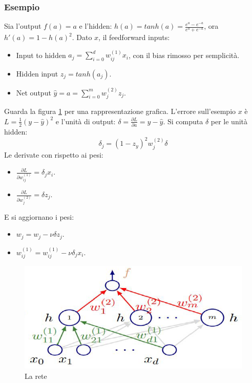 		\subsubsection{Esempio}
		Sia l'output $f(a) = a$ e l'hidden: $h(a) = tanh(a) = \frac{e^a-e^{-a}}{e^a+e^{-a}}$, ora $h'(a) = 1-h(a)^2$.
		Dato $x$, il feedforward inputs:
		\begin{multicols}{2}
			\begin{itemize}
				\item Input to hidden $a_j = \sum\limits_{i = 0}^d w_{ij}^{(1)}x_i$, con il bias rimosso per semplicit\`a.
				\item Hidden input $z_j = tanh(a_j)$.
				\item Net output $\hat{y} = a = \sum\limits_{i = 0}^m w_j^{(2)} z_j$.
			\end{itemize}
		\end{multicols}
		Guarda la figura \ref{fig:chapter11-14} per una rappresentazione grafica.
		L'errore sull'esempio $x$ \`e $L= \frac{1}{2}(y-\hat{y})^2$ e l'unit\`a di output: $\delta = \frac{\partial L}{\partial a} = y - \hat{y}$.
		Si computa $\delta$ per le unit\`a hidden:
		$$\delta_j = (1-z_y)^2w_j^{(2)}\delta$$
		Le derivate con rispetto ai pesi:
		\begin{multicols}{2}
			\begin{itemize}
				\item $\frac{\partial L}{\partial w_{ij}^{(1)}} = \delta_jx_i$.
				\item $\frac{\partial L}{\partial w_j^{(2)}} = \delta z_j$.
			\end{itemize}
		\end{multicols}
		E si aggiornano i pesi:
		\begin{multicols}{2}
			\begin{itemize}
				\item $w_j = w_j - \nu \delta z_j$.
				\item $w_{ij}^{(1)} = w_{ij}^{(1)} - \nu \delta_jx_i$.
			\end{itemize}
		\end{multicols}
		\begin{figure}
			\centering
			\includegraphics[width=0.6\linewidth]{imgs/chapter11/img14}
			\caption{La rete}
			\label{fig:chapter11-14}
		\end{figure}

